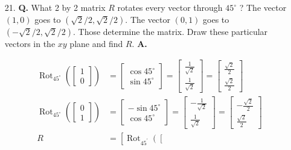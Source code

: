 \documentclass[main.tex]{subfiles}
\begin{document}
\begin{enumerate}
\begin{enumerate}
        \end{enumerate} 

        \item [21.] \textbf{Q.} What 2 by 2 matrix $R$ rotates every vector through $45^{\circ}$ ? The vector $(1,0)$ goes to $(\sqrt{2} / 2, \sqrt{2} / 2)$. The vector $(0,1)$ goes to $(-\sqrt{2} / 2, \sqrt{2} / 2)$. Those determine the matrix. Draw these particular vectors in the $x y$ plane and find $R$. \textbf{A.}
        
        $$
        \begin{aligned}
        \operatorname{Rot}_{45^{\circ}}\left(\left[\begin{array}{l}
        1 \\
        0
        \end{array}\right]\right) 
        & =\left[\begin{array}{l}
        \cos 45^{\circ} \\
        \sin 45^{\circ}
        \end{array}\right]
        =\left[\begin{array}{c}
        \frac{1}{\sqrt{2}} \\
        \frac{1}{\sqrt{2}}
        \end{array}\right]
        = \left[\begin{array}{c}
        \frac{\sqrt{2}}{2} \\
        \frac{\sqrt{2}}{2}
        \end{array}\right] \\
        \operatorname{Rot}_{45^{\circ}}\left(\left[\begin{array}{l}
        0 \\
        1
        \end{array}\right]\right)
        & =\left[\begin{array}{c}
        -\sin 45^{\circ} \\
        \cos 45^{\circ}
        \end{array}\right] 
        =\left[\begin{array}{c}
        -\frac{1}{\sqrt{2}} \\
        \frac{1}{\sqrt{2}}
        \end{array}\right]=\left[\begin{array}{c}
        -\frac{\sqrt{2}}{2} \\
        \frac{\sqrt{2}}{2}
        \end{array}\right] \\
        R & = \left[\operatorname{Rot}_{45^{\prime}}\left(\left[\begin{array}{l}

\end{array}
\end{aligned}$$
\end{enumerate}
\end{document}
